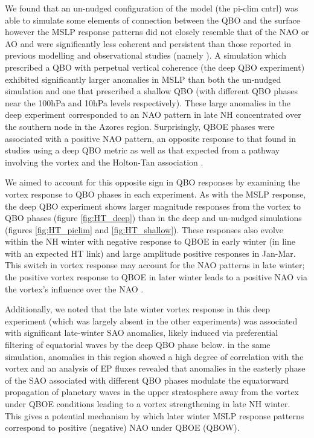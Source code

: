 We found that an un-nudged configuration of the model (the pi-clim cntrl) was able to simulate some elements of connection between the QBO and the surface however the MSLP response patterns did not closely resemble that of the NAO or AO and were significantly less coherent and persistent than those reported in previous modelling and observational studies (namely \cite{andrewsObserved2019d}). A simulation which prescribed a QBO with perpetual vertical coherence (the deep QBO experiment) exhibited significantly larger anomalies in MSLP than both the un-nudged simulation and one that prescribed a shallow QBO (with different QBO phases near the 100hPa and 10hPa levels respectively). These large anomalies in the deep experiment corresponded to an NAO pattern in late NH concentrated over the southern node in the Azores region. Surprisingly, QBOE phases were associated with a positive NAO pattern, an opposite response to that found in studies using a deep QBO metric \citep{andrewsObserved2019d} as well as that expected from a pathway involving the vortex and the Holton-Tan association \citep{HoltonJamesRTan1980}.

We aimed to account for this opposite sign in QBO responses by examining the vortex response to QBO phases in each experiment. As with the MSLP response, the deep QBO experiment shows larger magnitude responses from the vortex to QBO phases (figure \ref{fig:HT_deep}) than in the deep and un-nudged simulations (figures \ref{fig:HT_piclim} and \ref{fig:HT_shallow}). These responses also evolve within the NH winter with negative response to QBOE in early winter (in line with an expected HT link) and large amplitude positive responses in Jan-Mar. This switch in vortex response may account for the NAO patterns in late winter; the positive vortex response to QBOE in later winter leads to a positive NAO via the vortex's influence over the NAO \citep{charlton-perezInfluence2018e}. 

Additionally, we noted that the late winter vortex response in this deep experiment (which was largely absent in the other experiments) was associated with significant late-winter SAO anomalies, likely induced via preferential filtering of equatorial waves by the deep QBO phase below. in the same simulation, anomalies in this region showed a high degree of correlation with the vortex and an analysis of EP fluxes revealed that anomalies in the easterly phase of the SAO associated with different QBO phases modulate the equatorward propagation of planetary waves in the upper stratosphere away from the vortex under QBOE conditions leading to a vortex strengthening in late NH winter. This gives a potential mechanism by which later winter MSLP response patterns correspond to positive (negative) NAO under QBOE (QBOW). 

